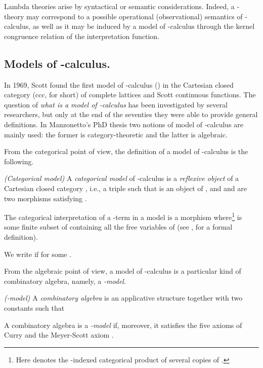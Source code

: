 \documentclass[english]{llncs}
\begin{document}
Lambda theories arise by syntactical or semantic considerations. 
Indeed, a -theory may correspond to a possible operational (observational) semantics of -calculus, as well as it 
may be induced by a model of -calculus through the kernel congruence relation of the interpretation function.

\subsection{Models of -calculus.} \label{subs:lambda models}

In 1969, Scott found the first model of -calculus () in the Cartesian closed category (ccc, for short) of complete lattices and 
Scott continuous functions. 
The question of \emph{what is a model of -calculus} has been investigated by several researchers, but only at the end of the seventies
they were able to provide general definitions.
In Manzonetto's PhD thesis \cite{ManzonettoTh} two notions of model of -calculus are mainly used: the former is category-theoretic 
and the latter is algebraic. 

From the categorical point of view, the definition of a model of -calculus is the following. 

\begin{definition} {\em (Categorical model)} A \emph{categorical model} of -calculus is a \emph{reflexive object} of a Cartesian closed category , 
i.e., a triple  such that  is an object of , and   and 
are two morphisms satisfying . 
\end{definition}

The categorical interpretation of a -term  in a model  is a morphism  where\footnote{
Here  denotes the -indexed categorical product  of several copies of .
}  is some finite subset of 
containing all the free variables of  (see \cite[Def.~5.5.3(vii)]{Bare}, for a formal definition). 

We write  if  for some .

From the algebraic point of view, a model of -calculus is a particular kind of combinatory algebra, namely, a {\em -model}.

\begin{definition} 
{\em (-model)} A \emph{combinatory algebra}  is an applicative structure together with two constants
 such that 

A combinatory algebra  is a {\em -model} if, moreover, it satisfies the five axioms of Curry \cite[Thm.~5.2.5]{Bare} and the Meyer-Scott axiom \cite[Def.~5.2.7(ii)]{Bare}.
\end{definition}
\end{document}

